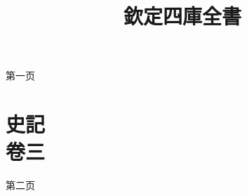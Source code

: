 \documentclass{ltc-guji}
\title{欽定四庫全書}
\begin{document}
\begin{正文}

第一页
\clearpage

\chapter{史記\\卷三}
第二页


\end{正文}
\end{document}
